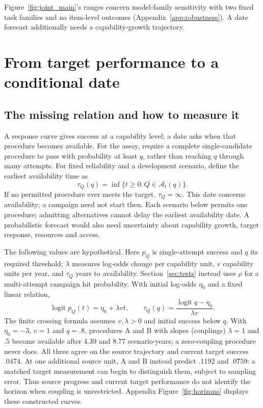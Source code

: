 Figure~\ref{fig:joint_main}'s ranges concern model-family sensitivity with two fixed task families and no item-level outcomes (Appendix~\ref{app:robustness}). A date forecast additionally needs a capability-growth trajectory.

\section{From target performance to a conditional date}
\label{sec:horizons}
\subsection{The missing relation and how to measure it}
A response curve gives success at a capability level; a date asks when that procedure becomes available. For the assay, require a complete single-candidate procedure to pass with probability at least $q$, rather than reaching $q$ through many attempts. For fixed reliability and a development scenario, define the earliest availability time as
\begin{equation}
 \tau_Q(q)=\inf\{t\ge0:Q\in\mathcal A_t(q)\}.
 \label{eq:horizon}
\end{equation}
If no permitted procedure ever meets the target, $\tau_Q=\infty$. This date concerns availability; a campaign need not start then. Each scenario below permits one procedure; admitting alternatives cannot delay the earliest availability date. A probabilistic forecast would also need uncertainty about capability growth, target response, resources and access.

The following values are hypothetical. Here $p_Q$ is single-attempt success and $q$ its required threshold; $\lambda$ measures log-odds change per capability unit, $v$ capability units per year, and $\tau_Q$ years to availability. Section~\ref{sec:tests} instead uses $\rho$ for a multi-attempt campaign hit probability. With initial log-odds $\eta_0$ and a fixed linear relation,
\begin{equation}
 \operatorname{logit}p_Q(t)=\eta_0+\lambda vt,\qquad
 \tau_Q(q)=\frac{\operatorname{logit}q-\eta_0}{\lambda v}.
 \label{eq:crossing}
\end{equation}
The finite crossing formula assumes $v,\lambda>0$ and initial success below $q$. With $\eta_0=-3$, $v=1$ and $q=.8$, procedures A and B with slopes (couplings) $\lambda=1$ and $.5$ become available after 4.39 and 8.77 scenario-years; a zero-coupling procedure never does. All three agree on the source trajectory and current target success $.0474$. At one additional source unit, A and B instead predict $.1192$ and $.0759$: a matched target measurement can begin to distinguish them, subject to sampling error. Thus source progress and current target performance do not identify the horizon when coupling is unrestricted. Appendix Figure~\ref{fig:horizons} displays these constructed curves. 



